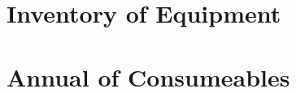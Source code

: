 \documentclass{./BeekeepingBook}
\begin{document}
\section{Inventory of Equipment}

\section{Annual of Consumeables}
\end{document}
